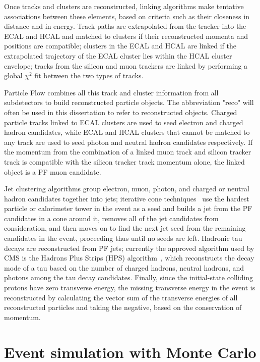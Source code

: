 Once tracks and clusters are reconstructed, linking algorithms make tentative associations between these elements, based on criteria such as their closeness in distance and in energy. Track paths are extrapolated from the tracker into the ECAL and HCAL and matched to clusters if their reconstructed momenta and positions are compatible; clusters in the ECAL and HCAL are linked if the extrapolated trajectory of the ECAL cluster lies within the HCAL cluster envelope; tracks from the silicon and muon trackers are linked by performing a global $\chi^2$ fit between the two types of tracks.

Particle Flow combines all this track and cluster information from all subdetectors to build reconstructed particle objects. The abbreviation "reco" will often be used in this dissertation to refer to reconstructed objects. Charged particle tracks linked to ECAL clusters are used to seed electron and charged hadron candidates, while ECAL and HCAL clusters that cannot be matched to any track are used to seed photon and neutral hadron candidates respectively. If the momentum from the combination of a linked muon track and silicon tracker track is compatible with the silicon tracker track momentum alone, the linked object is a PF muon candidate.

Jet clustering algorithms group electron, muon, photon, and charged or neutral hadron candidates together into jets; iterative cone techniques~\cite{1126-6708-2008-04-063} use the hardest particle or calorimeter tower in the event as a seed and builds a jet from the PF candidates in a cone around it, removes all of the jet candidates from consideration, and then moves on to find the next jet seed from the remaining candidates in the event, proceeding thus until no seeds are left. Hadronic tau decays are reconstructed from PF jets; currently the approved algorithm used by CMS is the Hadrons Plus Strips (HPS) algorithm~\cite{CMS:2011msa}, which reconstructs the decay mode of a tau based on the number of charged hadrons, neutral hadrons, and photons among the tau decay candidates. Finally, since the initial-state colliding protons have zero transverse energy, the missing transverse energy in the event is reconstructed by calculating the vector sum of the transverse energies of all reconstructed particles and taking the negative, based on the conservation of momentum.

\section{Event simulation with Monte Carlo\label{sec:cms-sim}}

